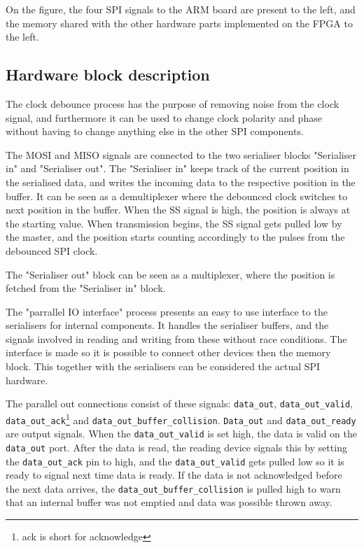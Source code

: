 On the figure, the four SPI signals to the ARM board are present to the left, and the memory shared with the other hardware parts implemented on the FPGA to the left.

\subsection{Hardware block description}
The clock debounce process has the purpose of removing noise from the clock signal, and furthermore it can be used to change clock polarity and phase without having to change anything else in the other SPI components.

The MOSI and MISO signals are connected to the two serialiser blocks "Serialiser in" and "Serialiser out". The "Serialiser in" keeps track of the current position in the serialised data, and writes the incoming data to the respective position in the buffer. It can be seen as a demultiplexer where the debounced clock switches to next position in the buffer. When the SS signal is high, the position is always at the starting value. When transmission begins, the SS signal gets pulled low by the master, and the position starts counting accordingly to the pulses from the debounced SPI clock. 

The "Serialiser out" block can be seen as a multiplexer, where the position is fetched from the "Serialiser in" block.

The "parrallel IO interface" process presents an easy to use interface to the serialisers for internal components. It handles the serialiser buffers, and the signals involved in reading and writing from these without race conditions. The interface is made so it is possible to connect other devices then the memory block. This together with the serialisers can be considered the actual SPI hardware. 

The parallel out connections consist of these signals: \texttt{data\_out}, \texttt{data\_out\_valid}, \texttt{data\_out\_ack}\footnote{ack is short for acknowledge} and \texttt{data\_out\_buffer\_collision}. \texttt{Data\_out} and \texttt{data\_out\_ready} are output signals. When the \texttt{data\_out\_valid} is set high, the data is valid on the \texttt{data\_out} port. After the data is read, the reading device signals this by setting the \texttt{data\_out\_ack} pin to high, and the \texttt{data\_out\_valid} gets pulled low so it is ready to signal next time data is ready. If the data is not acknowledged before the next data arrives, the \texttt{data\_out\_buffer\_collision} is pulled high to warn that an internal buffer was not emptied and data was possible thrown away.

